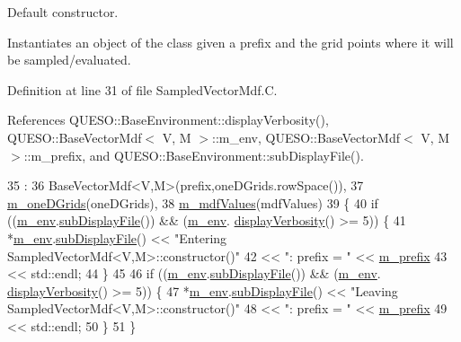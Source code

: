 Default constructor. 

Instantiates an object of the class given a prefix and the grid points where it will be sampled/evaluated. 

Definition at line 31 of file Sampled\-Vector\-Mdf.\-C.



References Q\-U\-E\-S\-O\-::\-Base\-Environment\-::display\-Verbosity(), Q\-U\-E\-S\-O\-::\-Base\-Vector\-Mdf$<$ V, M $>$\-::m\-\_\-env, Q\-U\-E\-S\-O\-::\-Base\-Vector\-Mdf$<$ V, M $>$\-::m\-\_\-prefix, and Q\-U\-E\-S\-O\-::\-Base\-Environment\-::sub\-Display\-File().


\begin{DoxyCode}
35   :
36   BaseVectorMdf<V,M>(prefix,oneDGrids.rowSpace()),
37   \hyperlink{class_q_u_e_s_o_1_1_sampled_vector_mdf_ace43cdea4553e95bec0fa1490962dd69}{m\_oneDGrids}(oneDGrids),
38   \hyperlink{class_q_u_e_s_o_1_1_sampled_vector_mdf_acc6447be666d94453ca26e8b0b8aa9ad}{m\_mdfValues}(mdfValues)
39 \{
40   \textcolor{keywordflow}{if} ((\hyperlink{class_q_u_e_s_o_1_1_base_vector_mdf_a39fbb4c9b12a0906a6d8c82535c837c7}{m\_env}.\hyperlink{class_q_u_e_s_o_1_1_base_environment_a8a0064746ae8dddfece4229b9ad374d6}{subDisplayFile}()) && (\hyperlink{class_q_u_e_s_o_1_1_base_vector_mdf_a39fbb4c9b12a0906a6d8c82535c837c7}{m\_env}.
      \hyperlink{class_q_u_e_s_o_1_1_base_environment_a1fe5f244fc0316a0ab3e37463f108b96}{displayVerbosity}() >= 5)) \{
41     *\hyperlink{class_q_u_e_s_o_1_1_base_vector_mdf_a39fbb4c9b12a0906a6d8c82535c837c7}{m\_env}.\hyperlink{class_q_u_e_s_o_1_1_base_environment_a8a0064746ae8dddfece4229b9ad374d6}{subDisplayFile}() << \textcolor{stringliteral}{"Entering SampledVectorMdf<V,M>::constructor()"}
42                            << \textcolor{stringliteral}{": prefix = "} << \hyperlink{class_q_u_e_s_o_1_1_base_vector_mdf_ada097dfdcb97838d0bd71a25ed7a4193}{m\_prefix}
43                            << std::endl;
44   \}
45 
46   \textcolor{keywordflow}{if} ((\hyperlink{class_q_u_e_s_o_1_1_base_vector_mdf_a39fbb4c9b12a0906a6d8c82535c837c7}{m\_env}.\hyperlink{class_q_u_e_s_o_1_1_base_environment_a8a0064746ae8dddfece4229b9ad374d6}{subDisplayFile}()) && (\hyperlink{class_q_u_e_s_o_1_1_base_vector_mdf_a39fbb4c9b12a0906a6d8c82535c837c7}{m\_env}.
      \hyperlink{class_q_u_e_s_o_1_1_base_environment_a1fe5f244fc0316a0ab3e37463f108b96}{displayVerbosity}() >= 5)) \{
47     *\hyperlink{class_q_u_e_s_o_1_1_base_vector_mdf_a39fbb4c9b12a0906a6d8c82535c837c7}{m\_env}.\hyperlink{class_q_u_e_s_o_1_1_base_environment_a8a0064746ae8dddfece4229b9ad374d6}{subDisplayFile}() << \textcolor{stringliteral}{"Leaving SampledVectorMdf<V,M>::constructor()"}
48                            << \textcolor{stringliteral}{": prefix = "} << \hyperlink{class_q_u_e_s_o_1_1_base_vector_mdf_ada097dfdcb97838d0bd71a25ed7a4193}{m\_prefix}
49                            << std::endl;
50   \}
51 \}
\end{DoxyCode}
